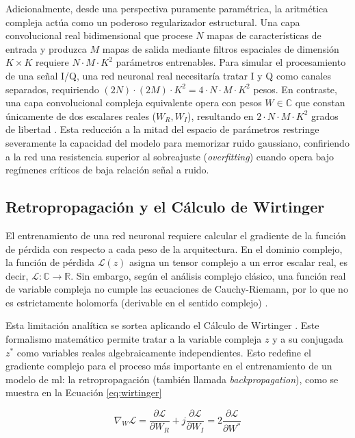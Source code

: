 Adicionalmente, desde una perspectiva puramente paramétrica, la aritmética compleja actúa como un poderoso regularizador estructural. Una capa convolucional real bidimensional que procese $N$ mapas de características de entrada y produzca $M$ mapas de salida mediante filtros espaciales de dimensión $K \times K$ requiere $N \cdot M \cdot K^2$ parámetros entrenables. Para simular el procesamiento de una señal I/Q, una red neuronal real necesitaría tratar I y Q como canales separados, requiriendo $(2N) \cdot (2M) \cdot K^2 = 4 \cdot N \cdot M \cdot K^2$ pesos. En contraste, una capa convolucional compleja equivalente \cite{trabelsi_deep_2018} opera con pesos $W \in \mathbb{C}$ que constan únicamente de dos escalares reales ($W_R, W_I$), resultando en $2 \cdot N \cdot M \cdot K^2$ grados de libertad \cite{hirose_complex_2012}. Esta reducción a la mitad del espacio de parámetros restringe severamente la capacidad del modelo para memorizar ruido gaussiano, confiriendo a la red una resistencia superior al sobreajuste (\textit{overfitting}) cuando opera bajo regímenes críticos de baja relación señal a ruido.

\subsection{Retropropagación y el Cálculo de Wirtinger}

El entrenamiento de una red neuronal requiere calcular el gradiente de la función de pérdida con respecto a cada peso de la arquitectura. En el dominio complejo, la función de pérdida $\mathcal{L}(z)$ asigna un tensor complejo a un error escalar real, es decir, $\mathcal{L}: \mathbb{C} \rightarrow \mathbb{R}$. Sin embargo, según el análisis complejo clásico, una función real de variable compleja no cumple las ecuaciones de Cauchy-Riemann, por lo que no es estrictamente holomorfa (derivable en el sentido complejo) \cite{khan_historic_2025}.

Esta limitación analítica se sortea aplicando el Cálculo de Wirtinger \cite{bouboulis_extension_2011}. Este formalismo matemático permite tratar a la variable compleja $z$ y a su conjugada $z^*$ como variables reales algebraicamente independientes. Esto redefine el gradiente complejo para el proceso más importante en el entrenamiento de un modelo de \gls{ml}: la retropropagación (también llamada \textit{backpropagation}), como se muestra en la Ecuación \ref{eq:wirtinger}

\begin{equation}
    \nabla_{W} \mathcal{L} = \frac{\partial \mathcal{L}}{\partial W_R} + j \frac{\partial \mathcal{L}}{\partial W_I} = 2 \frac{\partial \mathcal{L}}{\partial W^*}
    \label{eq:wirtinger}
\end{equation}

